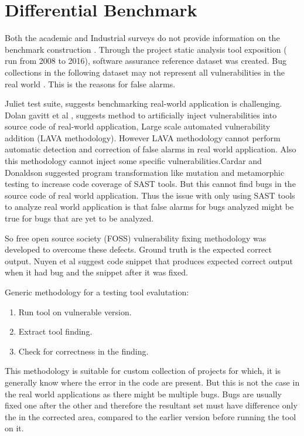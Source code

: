 \documentclass[authoryear,preprint]{sigplanconf}
\begin{document}
\section{Differential Benchmark}
\label{sec:sec_differential_benchmark}
Both the academic and Industrial surveys do not provide information on the benchmark construction\cite{5954458} \cite{5689543} . Through the project static analysis tool exposition ( run from 2008 to 2016), software assurance reference dataset was created. Bug collections in the following dataset may not represent all vulnerabilities in the real world\cite{greiman2016iccws} \cite{Kupsch2009ManualVA} \cite{Wilander250309}. This is the reasons for false alarms.

Juliet test suite, suggests benchmarking real-world application is challenging. Dolan gavitt et al \cite{7546498}, suggests method to artificially inject vulnerabilities into source code of real-world application, Large scale automated vulnerability addition (LAVA methodology). However LAVA methodology cannot perform automatic detection and correction of false alarms in real world application. Also this methodology cannot inject some specific vulnerabilities.Cardar and Donaldson \cite{Cadar:2016:APA:2889160.2889206} suggested program transformation like mutation and metamorphic testing to increase code coverage of SAST tools. But this cannot find bugs in the source code of  real world application. Thus the issue with only using SAST tools to analyze real world application is that false alarms for bugs analyzed might be true for bugs that are yet to be analyzed.

So free open source society (FOSS) \cite{Pashchenko:2017:FVD:3106237.3121276} vulnerability fixing methodology was developed to overcome these defects. Ground truth is the expected correct output. Nuyen et al \cite{Do:2016:TAB:2931021.2931023} suggest code snippet that produces expected correct output when it had bug and the snippet after it was fixed.

Generic methodology for a testing tool evalutation: 
\begin{enumerate}
	\item Run tool on vulnerable version.
	\item Extract tool finding.
	\item Check for correctness in the finding.
\end{enumerate}

This methodology is suitable for custom collection of projects for which, it is generally know where the error in the code are present. But this is not the case in the real world applications as there might be multiple bugs. Bugs are usually fixed one after the other and therefore the resultant set must have difference only the in the corrected area, compared to the earlier version before running the tool on it. 
\end{document}
